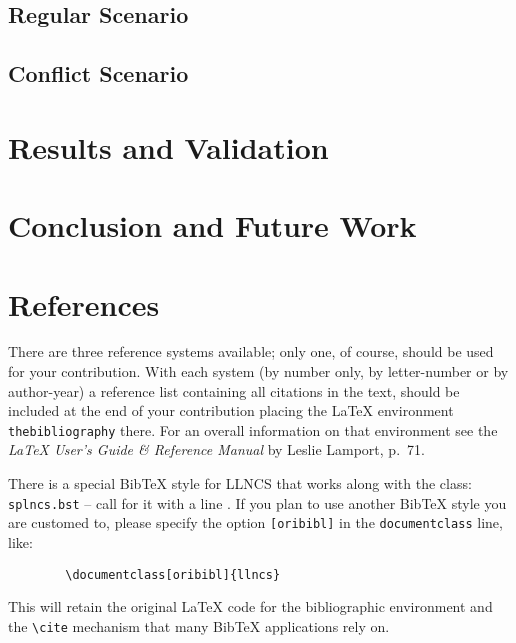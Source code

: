 \documentclass{llncs}
\begin{document}
    \subsection{Regular Scenario}
    \subsection{Conflict Scenario}
    \section{Results and Validation}
    \section{Conclusion and Future Work}
    \section{References}
    \label{refer}
    There are three reference systems available; only one, of course,
    should be used for your contribution. With each system (by
    number only, by letter-number or by author-year) a reference list
    containing all citations in the
    text, should be included at the end of your contribution placing the
    \LaTeX{} environment \verb|thebibliography| there.
    For an overall information on that environment
    see the {\em \LaTeX{} User's Guide \& Reference
    Manual\/} by Leslie Lamport, p.~71.

    There is a special {\sc Bib}\TeX{} style for LLNCS that works along
    with the class: \verb|splncs.bst|
    -- call for it with a line \verb||.
    If you plan to use another {\sc Bib}\TeX{} style you are customed to,
    please specify the option \verb|[oribibl]| in the
    \verb|documentclass| line, like:
    \begin{verbatim}
        \documentclass[oribibl]{llncs}
    \end{verbatim}
    This will retain the original \LaTeX{} code for the bibliographic
    environment and the \verb|\cite| mechanism that many {\sc Bib}\TeX{}
    applications rely on.
\end{document}
